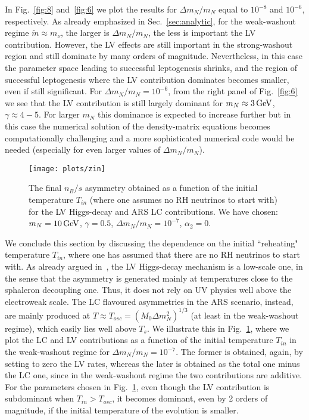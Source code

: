 \documentclass[prd,twocolumn,superscriptaddress,preprintnumbers,nofootinbib,
noshowpacs,groupedaddress]{revtex4-1} %
\begin{document}
In Fig.~\ref{fig:8} and~\ref{fig:6} we plot the results for $\Delta m_N/m_N$ equal to $10^{-8}$ and $10^{-6}$, respectively. As already emphasized in Sec.~\ref{sec:analytic}, for the weak-washout regime $\widetilde m \approx m_\nu$, the larger is $\Delta m_N/m_N$, the less is important the LV contribution. However, the LV effects are still important in the strong-washout region and still dominate by many orders of magnitude. Nevertheless, in this case the parameter space leading to successful leptogenesis shrinks, and the region of successful leptogenesis where the LV contribution dominates becomes smaller, even if still significant. For $\Delta m_N/m_N = 10^{-6}$, from the right panel of Fig.~\ref{fig:6} we see that the LV contribution is still largely dominant for $m_N \approx \unit[3]{GeV}$, $\gamma \approx 4-5$. For larger 
$m_N$ this dominance is expected to increase further but in this case the numerical solution of the density-matrix equations becomes computationally challenging and a more sophisticated numerical code would be needed (especially for even larger values of $\Delta m_N/m_N$).


\begin{figure}
\texttt{[image: plots/zin]}
\caption{The final $n_B/s$ asymmetry obtained as a function of the initial temperature $T_{in}$ (where one assumes no RH neutrinos to start with) for the LV Higgs-decay and ARS LC contributions. We have chosen: $m_N=\unit[10]{GeV}$, $\gamma=0.5$, $\Delta m_N/m_N = 10^{-7}$, $\alpha_2=0$.\label{fig:Tin}}
\end{figure}

We conclude this section by discussing the dependence on the initial ``reheating" temperature $T_{in}$, where one has assumed that there are no RH neutrinos to start with. As already argued in~\cite{Hambye:2016sby}, the LV Higgs-decay mechanism is a low-scale one, in the sense that the asymmetry is generated mainly at temperatures close to the sphaleron decoupling one. Thus, it does not rely on UV physics well above the electroweak scale. The LC flavoured asymmetries in the ARS scenario, instead, are mainly produced at $T \approx T_{osc} = (M_0 \Delta m_N^2)^{1/3}$ (at least in the weak-washout regime), which easily lies well above $T_s$. We illustrate this in Fig.~\ref{fig:Tin}, where we plot the LC and LV contributions as a function of the initial temperature $T_{in}$ in the weak-washout regime for $\Delta m_N/m_N = 10^{-7}$. The former is obtained, again, by setting to zero the LV rates, whereas the later is obtained as the total one minus the LC one, since in the weak-washout regime the two contributions are additive. For the parameters chosen in Fig.~\ref{fig:Tin}, even though the LV contribution is subdominant when $T_{in} > T_{osc}$, it becomes dominant, even by 2 orders of magnitude, if the initial temperature of the evolution is smaller.
\end{document}
